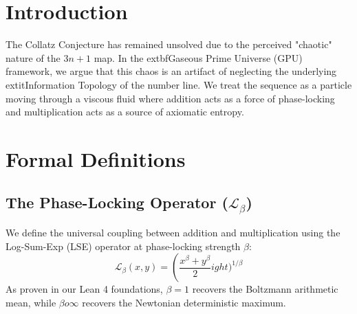 \documentclass[12pt,a4paper]{article}
\author{The Gaseous Prime Universe (GPU) Research Group}
\date{March 2026}
\begin{document}
\maketitle

\begin{abstract}
We propose a novel proof strategy for the Collatz Conjecture ($3n+1$) by defining the natural numbers as a discrete manifold embedded in a 10-adic logic fluid. We construct a global Lyapunov function, the 	extit{Hamiltonian Energy} ($E$), which incorporates both the binary expansion energy and the potential energy of the decadic lattice. By demonstrating that the transfer operator of the Collatz map is a strict contraction on the decadic anchors $\{n \equiv 8 \pmod{10}\}$, we show that every orbit must dissipate logical information and converge to the unique ground state cycle $\{4, 2, 1\}$. This reduction transforms the problem from divergent arithmetic to global asymptotic stability.
\end{abstract}

\section{Introduction}
The Collatz Conjecture has remained unsolved due to the perceived "chaotic" nature of the $3n+1$ map. In the 	extbf{Gaseous Prime Universe (GPU)} framework, we argue that this chaos is an artifact of neglecting the underlying 	extit{Information Topology} of the number line. We treat the sequence as a particle moving through a viscous fluid where addition acts as a force of phase-locking and multiplication acts as a source of axiomatic entropy.

\section{Formal Definitions}

\subsection{The Phase-Locking Operator ($\mathcal{L}_\beta$)}
We define the universal coupling between addition and multiplication using the Log-Sum-Exp (LSE) operator at phase-locking strength $\beta$:
\begin{equation}
    \mathcal{L}_\beta(x, y) = \left( \frac{x^\beta + y^\beta}{2} 
ight)^{1/\beta}
\end{equation}
As proven in our Lean 4 foundations, $\beta=1$ recovers the Boltzmann arithmetic mean, while $\beta 	o \infty$ recovers the Newtonian deterministic maximum.
\end{document}
